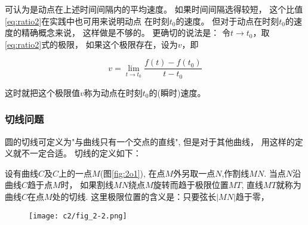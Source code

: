     可认为是动点在上述时间间隔内的平均速度。
    如果时间间隔选得较短，
    这个比值\eqref{eq:ratio2}在实践中也可用来说明动点
    在时刻$t_0$的速度。
    但对于动点在时刻$t_0$的速度的精确概念来说，
    这样做是不够的。
    更确切的说法是：
        令$t\to t_0$，取\eqref{eq:ratio2}式的极限，
        如果这个极限存在，设为$v$，即
    
        \[v=\lim_{t\to t_0} \frac{f(t)-f(t_0)}{t-t_0}\]

    这时就把这个极限值$v$称为动点在时刻$t_0$的(瞬时)速度。

    \subsubsection{切线问题}

    圆的切线可定义为"与曲线只有一个交点的直线", 但是对于其他曲线，
    用这样的定义就不一定合适。
    切线的定义如下：

    设有曲线$C$及$C$上的一点$M$(图\ref{fig:2o1}),
    在点$M$外另取一点$N$,作割线$MN$.
    当点$N$沿曲线$C$趋于点$M$时，
    如果割线$MN$绕点$M$旋转而趋于极限位置$MT$,
    直线$MT$就称为曲线$C$在点$M$处的切线.
    这里极限位置的含义是：只要弦长$|MN|$趋于零，

    \begin{figure}[htp]
        \centering
        \texttt{[image: c2/fig\_2-2.png]}
        \caption{}
        \label{fig:2o2}
    \end{figure}

